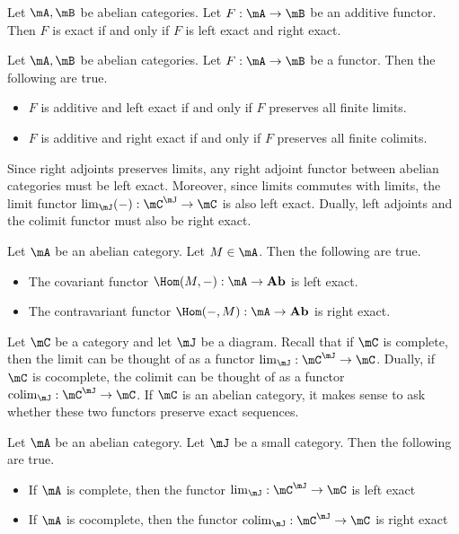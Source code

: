 \documentclass[a4paper]{article}
\begin{document}
\begin{lmm}{}{} Let $\mA,\mB$ be abelian categories. Let $F:\mA\to\mB$ be an additive functor. Then $F$ is exact if and only if $F$ is left exact and right exact. 
\end{lmm}

\begin{prp}{}{} Let $\mA,\mB$ be abelian categories. Let $F:\mA\to\mB$ be a functor. Then the following are true. 
\begin{itemize}
\item $F$ is additive and left exact if and only if $F$ preserves all finite limits. 
\item $F$ is additive and right exact if and only if $F$ preserves all finite colimits. 
\end{itemize}
\end{prp}

Since right adjoints preserves limits, any right adjoint functor between abelian categories must be left exact. Moreover, since limits commutes with limits, the limit functor $\lim_\mJ(-):\mC^\mJ\to\mC$ is also left exact. Dually, left adjoints and the colimit functor must also be right exact. 

\begin{prp}{}{} Let $\mA$ be an abelian category. Let $M\in\mA$. Then the following are true. 
\begin{itemize}
\item The covariant functor $\Hom(M,-):\mA\to\bold{Ab}$ is left exact. 
\item The contravariant functor $\Hom(-,M):\mA\to\bold{Ab}$ is right exact. 
\end{itemize}
\end{prp}

Let $\mC$ be a category and let $\mJ$ be a diagram. Recall that if $\mC$ is complete, then the limit can be thought of as a functor $\lim_\mJ:\mC^\mJ\to\mC$. Dually, if $\mC$ is cocomplete, the colimit can be thought of as a functor $\text{colim}_\mJ:\mC^\mJ\to\mC$. If $\mC$ is an abelian category, it makes sense to ask whether these two functors preserve exact sequences. 

\begin{prp}{}{} Let $\mA$ be an abelian category. Let $\mJ$ be a small category. Then the following are true. 
\begin{itemize}
\item If $\mA$ is complete, then the functor $\lim_\mJ:\mC^\mJ\to\mC$ is left exact
\item If $\mA$ is cocomplete, then the functor $\text{colim}_\mJ:\mC^\mJ\to\mC$ is right exact
\end{itemize}
\end{prp}
\end{document}
